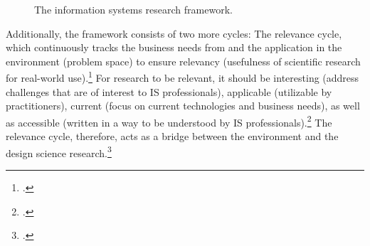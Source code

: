 \begin{figure}
    \centering
    
    \caption[The information systems research framework]{The information systems research framework.\protect\footnotemark}
    \label{fig:ISRFramework}
\end{figure}


 \label{topic:relevance cycle}
Additionally, the framework consists of two more cycles: The relevance cycle, which continuously tracks the business needs from and the application in the environment (problem space) to ensure relevancy (usefulness of scientific research for real-world use).\footcites[Cf.][p.70]{Simonsciencesartificial1996}[cf.][p.79]{HevnerDesignScienceResearch2004}[cf.][p.129]{ThomasBekannteundweniger2014} For research to be relevant, it should be interesting (address challenges that are of interest to \ac{IS} professionals), applicable (utilizable by practitioners), current (focus on current technologies and business needs), as well as accessible (written in a way to be understood by \ac{IS} professionals).\footcite[Cf.][p.5]{BenbasatEmpiricalresearchinformation1999} The relevance cycle, therefore, acts as a bridge between the environment and the design science research.\footcite[Cf.][p.89]{Hevnerthreecycleview2007} 

